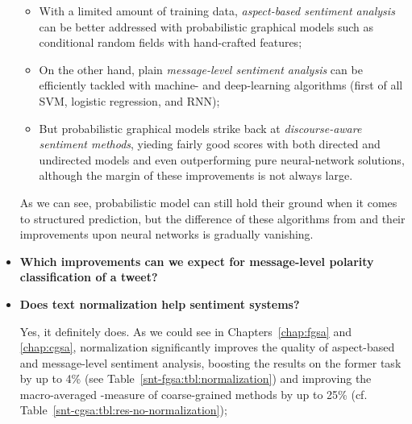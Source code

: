 \begin{itemize}
\begin{itemize}
      \item With a limited amount of training data, \emph{aspect-based
        sentiment analysis} can be better addressed with probabilistic
        graphical models such as conditional random fields with
        hand-crafted features;

      \item On the other hand, plain \emph{message-level sentiment
        analysis} can be efficiently tackled with machine- and
        deep-learning algorithms (first of all SVM, logistic
        regression, and RNN);

      \item But probabilistic graphical models strike back at
        \emph{discourse-aware sentiment methods}, yieding fairly good
        scores with both directed and undirected models and even
        outperforming pure neural-network solutions, although the
        margin of these improvements is not always large.
    \end{itemize}

    As we can see, probabilistic model can still hold their ground
    when it comes to structured prediction, but the difference of
    these algorithms from and their improvements upon neural networks
    is gradually vanishing.

  \item\textbf{Which improvements can we expect for message-level
    polarity classification of a tweet?}

  \item\textbf{Does text normalization help sentiment systems?}

    Yes, it definitely does.  As we could see in
    Chapters~\ref{chap:fgsa} and \ref{chap:cgsa}, normalization
    significantly improves the quality of aspect-based and
    message-level sentiment analysis, boosting the results on the
    former task by up to 4\% (see
    Table~\ref{snt-fgsa:tbl:normalization}) and improving the
    macro-averaged \F{}-measure of coarse-grained methods by up to
    25\% (cf. Table~\ref{snt-cgsa:tbl:res-no-normalization});


\end{itemize}
